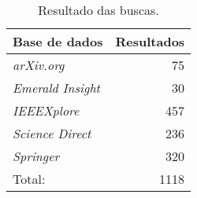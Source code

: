 \begin{table}[!htb]
    \centering
    \caption[Resultado das buscas por artigos nas bases selecionadas]{Resultado das buscas.
    \label{tab:resultadosBuscas1}}
    \begin{tabular}{lr}
        \toprule
           \textbf{Base de dados} & \textbf{Resultados} \\ \hline
        \midrule
            \textit{arXiv.org}              & 75                   \\
		\textit{Emerald Insight}        & 30                   \\
		\textit{IEEEXplore}             & 457                   \\
		\textit{Science Direct}         & 236                   \\
		\textit{Springer}               & 320                   \\ 
	\midrule
		Total:				& 1118	\\ \hline
        \bottomrule
    \end{tabular}
\end{table}